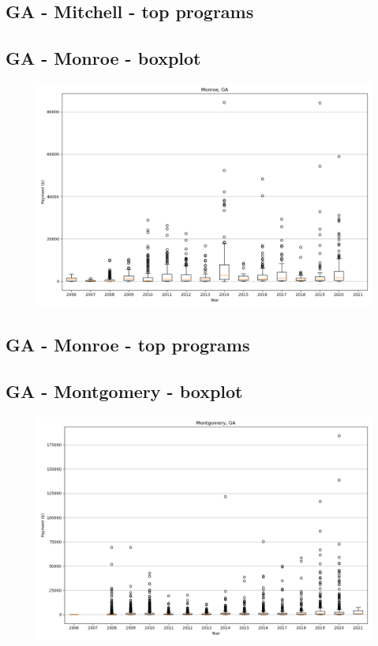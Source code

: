 \subsection*{GA - Mitchell - top programs}

\newpage
\subsection*{GA - Monroe - boxplot}
\begin{figure}[h]
\centering
\includegraphics[width=7in]{../output/boxplots/counties/Monroe-GA_boxplot.png}
\end{figure}


\subsection*{GA - Monroe - top programs}

\newpage
\subsection*{GA - Montgomery - boxplot}
\begin{figure}[h]
\centering
\includegraphics[width=7in]{../output/boxplots/counties/Montgomery-GA_boxplot.png}
\end{figure}


